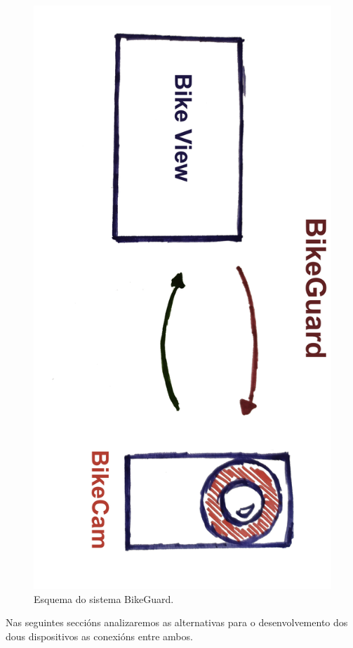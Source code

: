 \begin{figure}[tb]
  \centering
  \includegraphics[scale=0.1]{imaxes/bikeguard.jpg}
  \caption{Esquema do sistema BikeGuard.}
  \label{fig:bikeguard}
\end{figure}

Nas seguintes seccións analizaremos as alternativas para o desenvolvemento dos dous dispositivos as conexións entre ambos.

